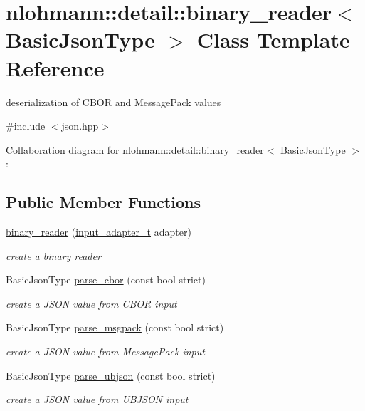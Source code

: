 \hypertarget{classnlohmann_1_1detail_1_1binary__reader}{}\section{nlohmann\+:\+:detail\+:\+:binary\+\_\+reader$<$ Basic\+Json\+Type $>$ Class Template Reference}
\label{classnlohmann_1_1detail_1_1binary__reader}


deserialization of C\+B\+OR and Message\+Pack values  




{\ttfamily \#include $<$json.\+hpp$>$}



Collaboration diagram for nlohmann\+:\+:detail\+:\+:binary\+\_\+reader$<$ Basic\+Json\+Type $>$\+:
\subsection*{Public Member Functions}
\begin{DoxyCompactItemize}
\item 
\hyperlink{classnlohmann_1_1detail_1_1binary__reader_a7e643baadaf4c31718cd74833bdd542f}{binary\+\_\+reader} (\hyperlink{namespacenlohmann_1_1detail_ae132f8cd5bb24c5e9b40ad0eafedf1c2}{input\+\_\+adapter\+\_\+t} adapter)
\begin{DoxyCompactList}\small\item\em create a binary reader \end{DoxyCompactList}\item 
Basic\+Json\+Type \hyperlink{classnlohmann_1_1detail_1_1binary__reader_a04bcdc8f55b26fafa9775a2f89e48fc2}{parse\+\_\+cbor} (const bool strict)
\begin{DoxyCompactList}\small\item\em create a J\+S\+ON value from C\+B\+OR input \end{DoxyCompactList}\item 
Basic\+Json\+Type \hyperlink{classnlohmann_1_1detail_1_1binary__reader_ab4a4a6f5ab3cc77aac374c9c889e580e}{parse\+\_\+msgpack} (const bool strict)
\begin{DoxyCompactList}\small\item\em create a J\+S\+ON value from Message\+Pack input \end{DoxyCompactList}\item 
Basic\+Json\+Type \hyperlink{classnlohmann_1_1detail_1_1binary__reader_ad0be02d1df4ba4fbe601b0985f5300ac}{parse\+\_\+ubjson} (const bool strict)
\begin{DoxyCompactList}\small\item\em create a J\+S\+ON value from U\+B\+J\+S\+ON input \end{DoxyCompactList}\end{DoxyCompactItemize}

